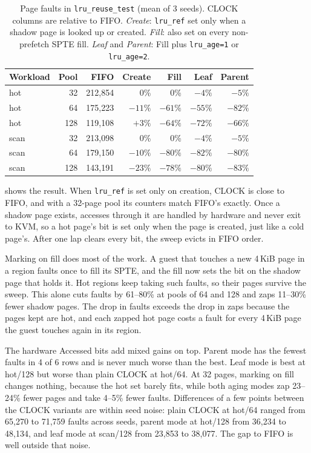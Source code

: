 \documentclass[letterpaper,twocolumn,10pt]{article}
\begin{document}
\begin{table}[t]
    \centering
    \footnotesize
    \setlength{\tabcolsep}{4pt}
    \begin{tabular}{lrrrrrr}
        \hline
        Workload & Pool & FIFO & Create & Fill & Leaf & Parent \\
        \hline
        hot  & 32  & 212{,}854 & 0\%     & 0\%     & $-4\%$  & $-5\%$  \\
        hot  & 64  & 175{,}223 & $-11\%$ & $-61\%$ & $-55\%$ & $-82\%$ \\
        hot  & 128 & 119{,}108 & $+3\%$  & $-64\%$ & $-72\%$ & $-66\%$ \\
        scan & 32  & 213{,}098 & 0\%     & 0\%     & $-4\%$  & $-5\%$  \\
        scan & 64  & 179{,}150 & $-10\%$ & $-80\%$ & $-82\%$ & $-80\%$ \\
        scan & 128 & 143{,}191 & $-23\%$ & $-78\%$ & $-80\%$ & $-83\%$ \\
        \hline
    \end{tabular}
    \caption{Page faults in \texttt{lru\_reuse\_test} (mean of 3 seeds). CLOCK
    columns are relative to FIFO. \emph{Create}: \texttt{lru\_ref} set only
    when a shadow page is looked up or created. \emph{Fill}: also set on every
    non-prefetch SPTE fill. \emph{Leaf} and \emph{Parent}: Fill plus
    \texttt{lru\_age=1} or \texttt{lru\_age=2}.}
    \label{tab:reuse}
\end{table}

 shows the result. When \texttt{lru\_ref} is set only on
creation, CLOCK is close to FIFO, and with a 32-page pool its counters match
FIFO's exactly. Once a shadow page exists, accesses through it are handled by
hardware and never exit to KVM, so a hot page's bit is set only when the page is
created, just like a cold page's. After one lap clears every bit, the sweep
evicts in FIFO order.

Marking on fill does most of the work. A guest that touches a new 4\,KiB page in
a region faults once to fill its SPTE, and the fill now sets the bit on the
shadow page that holds it. Hot regions keep taking such faults, so their pages
survive the sweep. This alone cuts faults by 61--80\% at pools of 64 and 128 and
zaps 11--30\% fewer shadow pages. The drop in faults exceeds the drop in zaps
because the pages kept are hot, and each zapped hot page costs a fault for every
4\,KiB page the guest touches again in its region.

The hardware Accessed bits add mixed gains on top. Parent mode has the fewest
faults in 4 of 6 rows and is never much worse than the best. Leaf mode is best
at hot/128 but worse than plain CLOCK at hot/64. At 32 pages, marking on fill
changes nothing, because the hot set barely fits, while both aging modes zap
23--24\% fewer pages and take 4--5\% fewer faults. Differences of a few points
between the CLOCK variants are within seed noise: plain CLOCK at hot/64 ranged
from 65{,}270 to 71{,}759 faults across seeds, parent mode at hot/128 from
36{,}234 to 48{,}134, and leaf mode at scan/128 from 23{,}853 to 38{,}077. The gap
to FIFO is well outside that noise.
\end{document}

